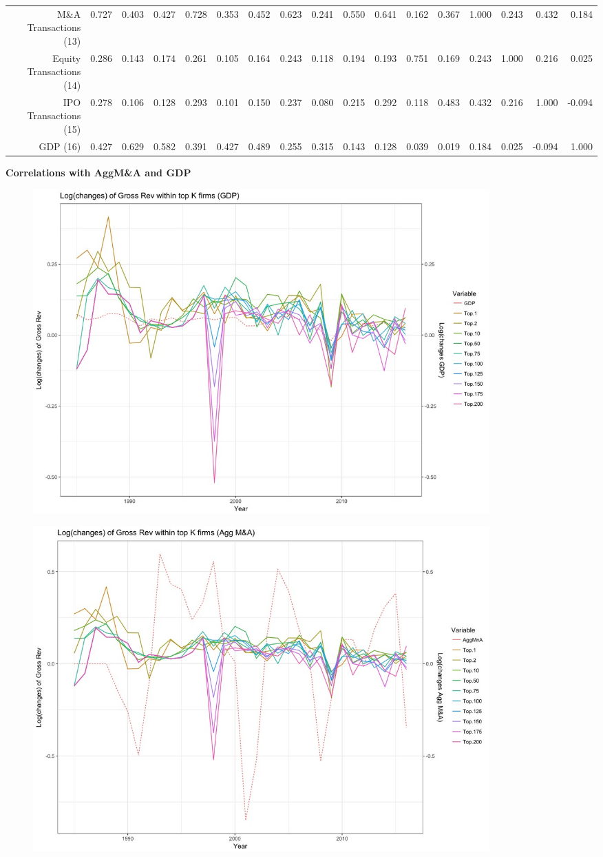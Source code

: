 \documentclass{article}
\begin{document}
\begin{table}[H]
\begin{tabular}{rrrrrrrrrrrrrrrrr}
  M\&A Transactions (13) & 0.727 & 0.403 & 0.427 & 0.728 & 0.353 & 0.452 & 0.623 & 0.241 & 0.550 & 0.641 & 0.162 & 0.367 & 1.000 & 0.243 & 0.432 & 0.184 \\
  Equity Transactions (14) & 0.286 & 0.143 & 0.174 & 0.261 & 0.105 & 0.164 & 0.243 & 0.118 & 0.194 & 0.193 & 0.751 & 0.169 & 0.243 & 1.000 & 0.216 & 0.025 \\
  IPO Transactions (15) & 0.278 & 0.106 & 0.128 & 0.293 & 0.101 & 0.150 & 0.237 & 0.080 & 0.215 & 0.292 & 0.118 & 0.483 & 0.432 & 0.216 & 1.000 & -0.094 \\
  GDP (16) & 0.427 & 0.629 & 0.582 & 0.391 & 0.427 & 0.489 & 0.255 & 0.315 & 0.143 & 0.128 & 0.039 & 0.019 & 0.184 & 0.025 & -0.094 & 1.000 \\
   \hline
\end{tabular}
\end{table}

\newpage
{\large \textbf{Correlations with AggM\&A and GDP} }
\begin{figure}[H]\centering
\includegraphics[width=0.85\textwidth]{../IndivTexOutput/MnAGDP-01.jpg}\end{figure}

\begin{figure}[H]\centering
\includegraphics[width=0.85\textwidth]{../IndivTexOutput/MnAGDP-02.jpg}\end{figure}
\end{document}
